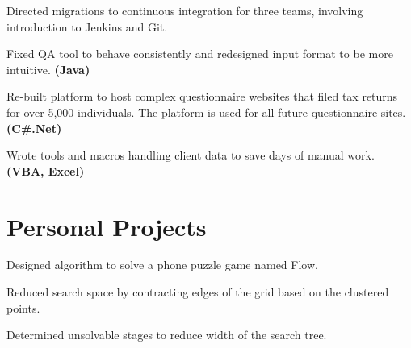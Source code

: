 \documentclass[letterpaper]{kevin-resume} %
\begin{document}
\begin{minipage}[t]{0.66\textwidth}
\sectionspace %


\begin{tightitemize}
	\item Directed migrations to continuous integration for three teams, involving introduction to Jenkins and Git.
	\item Fixed QA tool to behave consistently and redesigned input format to be more intuitive. \textbf{(Java)}
\end{tightitemize}

\sectionspace %


\begin{tightitemize}
	\item Re-built platform to host complex questionnaire websites that filed tax returns for over 5,000 individuals. The platform is used for all future questionnaire sites. \textbf{(C\#.Net)}
	\item Wrote tools and macros handling client data to save days of manual work. \textbf{(VBA, Excel)}
\end{tightitemize}

\sectionspace %


\sectionspace %

\section{Personal Projects}

\begin{tightitemize}
	\item Designed algorithm to solve a phone puzzle game named Flow.
 	\item Reduced search space by contracting edges of the grid based on the clustered points.
 	\item Determined unsolvable stages to reduce width of the search tree.
\end{tightitemize}


\end{minipage}
\end{document}
